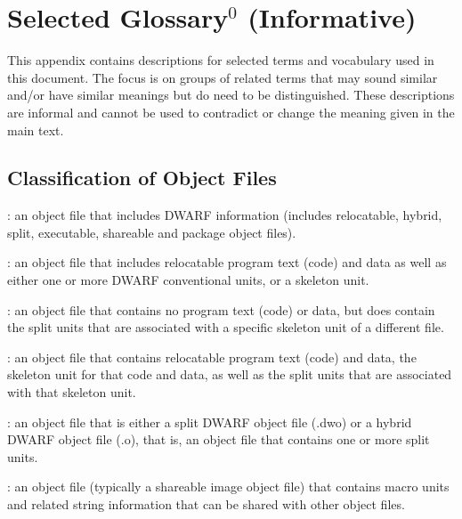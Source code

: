 \chapter[Selected Glossary (Informative)]{Selected Glossary$^0$ (Informative)}
\footnotetext[0]{\textcolor{green!30!black}{Note to Reviewers--This new Appendix is
an experiment. Comments regarding whether it should be
retained and expanded are solicited. --Ed.}}
\label{app:selectedglossary}

This appendix contains descriptions for selected terms
and vocabulary used in this document. The focus is on groups
of related terms that may sound similar and/or have similar 
meanings but do need to be distinguished. These descriptions
are informal and cannot be used to contradict or change the
meaning given in the main text. 
    
\section{Classification of Object Files}

\begin{description}
: an object file that includes 
DWARF information (includes relocatable, hybrid, split, executable,
shareable and package object files).

: an object file that includes 
relocatable program text (code) and data as well as either
one or more DWARF conventional units, or a skeleton unit.

: an object 
file that contains no program text (code) or data, but does 
contain the split units that are associated with a specific 
skeleton unit of a different file.
 
: an object 
file that contains relocatable program text (code) and data,
the skeleton unit for that code and data, as well as the 
split units that are associated with that skeleton unit.

: an object file that is 
either a split DWARF object file (.dwo) or a hybrid DWARF 
object file (.o), that is, an object file that contains 
one or more split units.

: an object file (typically
a shareable image object file) that contains macro units and
related string information that can be shared with other
object files.
\end{description}

